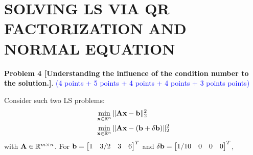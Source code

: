 \documentclass[english,onecolumn]{IEEEtran}
\begin{document}
\newpage
\section{SOLVING LS VIA QR FACTORIZATION AND NORMAL EQUATION}
\noindent\textbf{Problem 4 [Understanding the influence of the condition number to the solution.]}. \textcolor{blue}{(4 points + 5 points + 4 points + 4 points + 3 points points) }

Consider such two LS problems:
\begin{align}
    &\min_{{\bf x}\in\mathbb{R}^n} \|{\bf Ax - b}\|_2^2 \label{axb}\\
    &\min_{{\bf x}\in\mathbb{R}^n} \|{\bf A}{\bf x} - ({\bf b}+\delta{\bf b })\|_2^2 \nonumber%
\end{align}
with ${\bf A}\in \mathbb{R}^{m\times n}$. For ${\bf b} = \begin{bmatrix}
    1 & 3/2 & 3 & 6
    \end{bmatrix}^T$
    and 
    $\delta{\bf b} = \begin{bmatrix}
    1/10 & 0 & 0 & 0
    \end{bmatrix}^T$,
\end{document}

